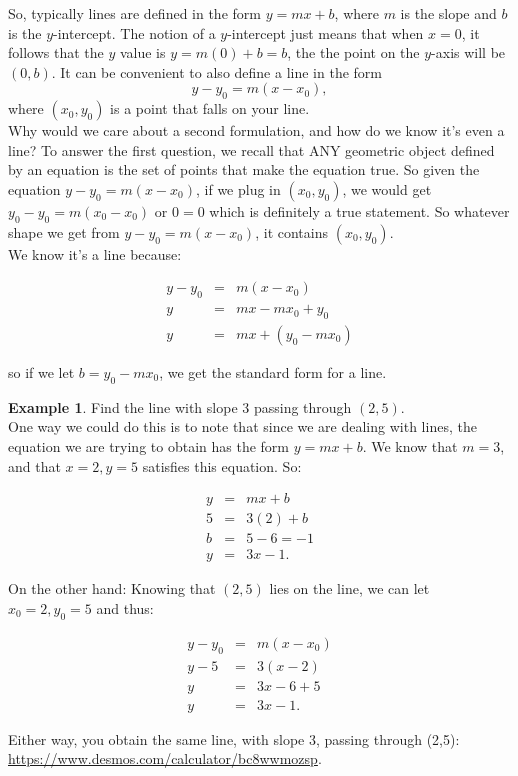 \documentclass[10pt]{article}
\theoremstyle{definition}
\newtheorem{example}[equation]{Example}
\begin{document}
So, typically lines are defined in the form $y=mx+b$, where $m$ is the slope and $b$ is the $y$-intercept.  The notion of a $y$-intercept just means that when $x=0$, it follows that the $y$ value is $y=m(0)+b=b$, the the point on the $y$-axis will be $(0,b)$.  It can be convenient to also define a line in the form $$y-y_0=m(x-x_0),$$ where $(x_0, y_0)$ is a point that falls on your line.\\

Why would we care about a second formulation, and how do we know it's even a line?  To answer the first question, we recall that ANY geometric object defined by an equation is the set of points that make the equation true.  So given the equation $y-y_0=m(x-x_0)$, if we plug in $(x_0, y_0)$, we would get $y_0-y_0=m(x_0-x_0)$ or $0=0$ which is definitely a true statement.  So whatever shape we get from $y-y_0=m(x-x_0)$, it contains $(x_0, y_0)$.\\

We know it's a line because:

\begin{eqnarray*}
y-y_0&=&m(x-x_0)\\
y&=&mx-mx_0+y_0\\
y&=&mx+(y_0-mx_0)
\end{eqnarray*}

so if we let $b=y_0-mx_0$, we get the standard form for a line.


\begin{example}
Find the line with slope 3 passing through $(2,5)$.\\

One way we could do this is to note that since we are dealing with lines, the equation we are trying to obtain has the form $y=mx+b$.  We know that $m=3$, and that $x=2, y=5$ satisfies this equation.  So:

\begin{eqnarray*}
y&=&mx+b\\
5&=&3(2)+b\\
b&=&5-6=-1\\
y&=&3x-1.
\end{eqnarray*}

On the other hand:  Knowing that $(2,5)$ lies on the line, we can let $x_0=2, y_0=5$ and thus:

\begin{eqnarray*}
y-y_0&=&m(x-x_0)\\
y-5&=&3(x-2)\\
y&=&3x-6+5\\
y&=&3x-1.
\end{eqnarray*}

Either way, you obtain the same line, with slope 3, passing through (2,5): \url{https://www.desmos.com/calculator/bc8wwmozsp}.

\end{example}
\end{document}
